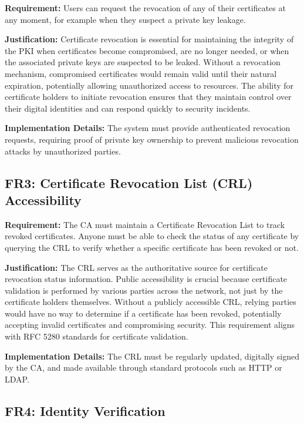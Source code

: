 \textbf{Requirement:} Users can request the revocation of any of their certificates at any moment, for example when they suspect a private key leakage.

\textbf{Justification:} Certificate revocation is essential for maintaining the integrity of the PKI when certificates become compromised, are no longer needed, or when the associated private keys are suspected to be leaked. Without a revocation mechanism, compromised certificates would remain valid until their natural expiration, potentially allowing unauthorized access to resources. The ability for certificate holders to initiate revocation ensures that they maintain control over their digital identities and can respond quickly to security incidents.

\textbf{Implementation Details:} The system must provide authenticated revocation requests, requiring proof of private key ownership to prevent malicious revocation attacks by unauthorized parties.

\subsection{FR3: Certificate Revocation List (CRL) Accessibility}

\textbf{Requirement:} The CA must maintain a Certificate Revocation List to track revoked certificates. Anyone must be able to check the status of any certificate by querying the CRL to verify whether a specific certificate has been revoked or not.

\textbf{Justification:} The CRL serves as the authoritative source for certificate revocation status information. Public accessibility is crucial because certificate validation is performed by various parties across the network, not just by the certificate holders themselves. Without a publicly accessible CRL, relying parties would have no way to determine if a certificate has been revoked, potentially accepting invalid certificates and compromising security. This requirement aligns with RFC 5280 standards for certificate validation.

\textbf{Implementation Details:} The CRL must be regularly updated, digitally signed by the CA, and made available through standard protocols such as HTTP or LDAP.

\subsection{FR4: Identity Verification}

